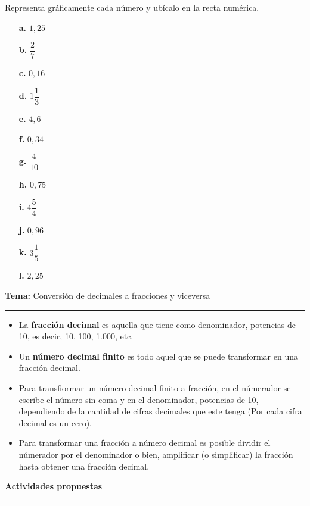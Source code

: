 \documentclass[spanish,letterpaper, 11pt, addpoints, answers]{exam}
\begin{document}
\begin{questions}
  \question Representa gráficamente cada número y ubícalo en la recta numérica.
  \begin{multicols}{2}
  \begin{itemize}
    \item[\textbf{a.}] $1{,}25$
    \item[\textbf{b.}] $\dfrac{2}{7}$
    \item[\textbf{c.}] $0{,}16$
    \item[\textbf{d.}] $1\dfrac{1}{3}$
    \item[\textbf{e.}] $4{,}6$
    \item[\textbf{f.}] $0{,}34$
    \item[\textbf{g.}] $\dfrac{4}{10}$
    \item[\textbf{h.}] $0{,}75$
    \item[\textbf{i.}] $4\dfrac{5}{4}$
    \item[\textbf{j.}] $0{,}96$
    \item[\textbf{k.}] $3\dfrac{1}{5}$
    \item[\textbf{l.}] $2{,}25$
    \end{itemize}
  \end{multicols}

\newpage
  \vspace{0.1in}
  \parbox{6in}{
  \textbf{Tema:} Conversión de decimales a fracciones y viceversa}
  \vspace{0.15in}
  \hrule 
  
  \begin{itemize}
    \item La \textbf{fracción decimal} es aquella que tiene como denominador, potencias de 10, es decir, 10, 100, 1.000, etc.
    \item Un \textbf{número decimal finito} es todo aquel que se puede transformar en una fracción decimal.
    \item Para transfiormar un número decimal finito a fracción, en el númerador se escribe el número sin coma y en el denominador, potencias de 10, dependiendo de la cantidad de cifras decimales que este tenga (Por cada cifra decimal es un cero).
    \item Para transformar una fracción a número decimal es posible dividir el númerador por el denominador o bien, amplificar (o simplificar) la fracción hasta obtener una fracción decimal.
    
  \end{itemize}
  
  \parbox{6in}{
  \textbf{Actividades propuestas}}
  \vspace{0.15in}
  \hrule 



\end{questions}
\end{document}
